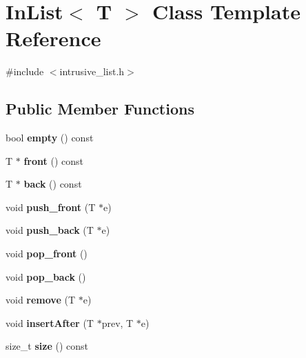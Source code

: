 \hypertarget{classInList}{\section{In\-List$<$ T $>$ Class Template Reference}
\label{classInList}
}


{\ttfamily \#include $<$intrusive\-\_\-list.\-h$>$}

\subsection*{Public Member Functions}
\begin{DoxyCompactItemize}
\item 
\hypertarget{classInList_a7a8424b88bf7ead661583383d3f6d482}{bool {\bfseries empty} () const }\label{classInList_a7a8424b88bf7ead661583383d3f6d482}

\item 
\hypertarget{classInList_a2964593cb6b7b50c5224737cac3e54ec}{T $\ast$ {\bfseries front} () const }\label{classInList_a2964593cb6b7b50c5224737cac3e54ec}

\item 
\hypertarget{classInList_a586c6530f61f9e616fab209f905c7de8}{T $\ast$ {\bfseries back} () const }\label{classInList_a586c6530f61f9e616fab209f905c7de8}

\item 
\hypertarget{classInList_a68363298d236385c7e8e8c61884750c2}{void {\bfseries push\-\_\-front} (T $\ast$e)}\label{classInList_a68363298d236385c7e8e8c61884750c2}

\item 
\hypertarget{classInList_a0d0666e7a9551ab6fcfa0b9163566ce6}{void {\bfseries push\-\_\-back} (T $\ast$e)}\label{classInList_a0d0666e7a9551ab6fcfa0b9163566ce6}

\item 
\hypertarget{classInList_ae4e75eaab71a02cbb7bebc00c4b2cd33}{void {\bfseries pop\-\_\-front} ()}\label{classInList_ae4e75eaab71a02cbb7bebc00c4b2cd33}

\item 
\hypertarget{classInList_a0cd4e2762a14cdce257d6d517f4fb5a2}{void {\bfseries pop\-\_\-back} ()}\label{classInList_a0cd4e2762a14cdce257d6d517f4fb5a2}

\item 
\hypertarget{classInList_af9772dd74412cf9f96d64bccf3e15ccc}{void {\bfseries remove} (T $\ast$e)}\label{classInList_af9772dd74412cf9f96d64bccf3e15ccc}

\item 
\hypertarget{classInList_af0fb0a1618368e179e9b8d8e5e2951de}{void {\bfseries insert\-After} (T $\ast$prev, T $\ast$e)}\label{classInList_af0fb0a1618368e179e9b8d8e5e2951de}

\item 
\hypertarget{classInList_afba6855e55a2347623a9a9dd82f23ddd}{size\-\_\-t {\bfseries size} () const }\label{classInList_afba6855e55a2347623a9a9dd82f23ddd}

\end{DoxyCompactItemize}


